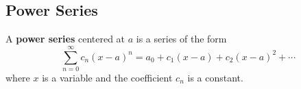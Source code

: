 \subsection{Power Series}
A \textbf{power series} centered at \(a\) is a series of the form
\[\sum_{n=0}^{\infty}c_n(x-a)^n=a_0+c_1(x-a)+c_2(x-a)^2+\cdots\]
where \(x\) is a variable and the coefficient \(c_n\) is a constant.